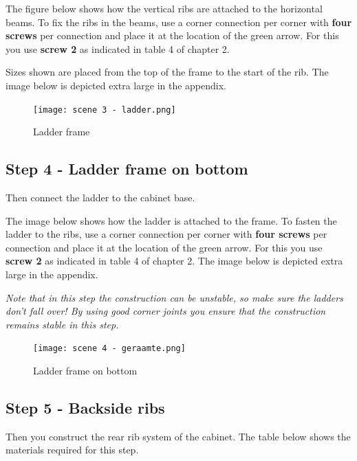\documentclass{article}
\begin{document}


The figure below shows how the vertical ribs are attached to the horizontal beams. To fix the ribs in the beams, use a corner connection per corner with \textbf{four screws} per connection and place it at the location of the green arrow. For this you use \textbf{screw 2} as indicated in table 4 of chapter 2.

Sizes shown are placed from the top of the frame to the start of the rib. The image below is depicted extra large in the appendix.

\begin{figure}[h!]
    \centering
    \texttt{[image: scene 3 - ladder.png]}
    \caption{Ladder frame}
    \label{fig:stap 3}
\end{figure}

\clearpage
\newpage

\subsection{Step 4 - Ladder frame on bottom}

Then connect the ladder to the cabinet base.

The image below shows how the ladder is attached to the frame. To fasten the ladder to the ribs, use a corner connection per corner with \textbf{four screws} per connection and place it at the location of the green arrow. For this you use \textbf{screw 2} as indicated in table 4 of chapter 2.
The image below is depicted extra large in the appendix.

\begin{center}
\textit{Note that in this step the construction can be unstable, so make sure the ladders don't fall over! By using good corner joints you ensure that the construction remains stable in this step.}
\end{center}

\begin{figure}[h!]
    \centering
    \texttt{[image: scene 4 - geraamte.png]}
    \caption{Ladder frame on bottom}
    \label{fig:stap 4}
\end{figure}

\clearpage
\newpage

\subsection{Step 5 - Backside ribs}

Then you construct the rear rib system of the cabinet. The table below shows the materials required for this step.
\end{document}
